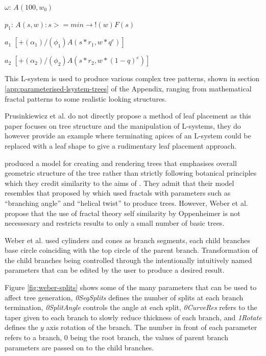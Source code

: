 \documentclass[final]{cmpreport}
\begin{document}
$\omega$: $A(100, w_0)$ 

\indent $p_1$: $A(s, w) : s >= min \rightarrow !(w)F(s)$

\indent $a_1$ $[+(\alpha_1)/(\phi_1)A(s * r_1, w * q ^ e)]$

\indent $a_2$ $[+(\alpha_2)/(\phi_2)A(s * r_2, w * (1 - q) ^ e)]$

This L-system is used to produce various complex tree patterns, shown in section 
\ref{app:parameterised-lsystem-trees} of the Appendix, ranging from mathematical fractal 
patterns to some realistic looking structures.

Prusinkiewicz et al. do not directly propose a method of leaf placement as this 
paper focuses on tree structure and the manipulation of L-systems, they do however provide 
an example where terminating apices of an L-system could be replaced with a leaf shape to 
give a rudimentary leaf placement approach.

\cite{weber1995rendering} produced a model for creating and rendering trees that emphasises 
overall geometric structure of the tree rather than strictly following botanical principles 
which they credit similarity to the aims of \cite{reeves1985approximate}. 
They admit that their model resembles that proposed by \cite{oppenheimer1986real} which used 
fractals with parameters such as ``branching angle'' and ``helical twist'' to produce trees. 
However, Weber et al. propose that the use of fractal theory self similarity by Oppenheimer 
is not necessesary and restricts results to only a small number of basic trees.

Weber et al. used cylinders and cones as branch segments, 
each child branches base circle coinciding with the top circle of the parent branch. 
Transformation of the child branches being controlled through the intentionally intuitively named 
parameters that can be edited by the user to produce a desired result.

Figure \ref{fig:weber-splits} shows some of the many parameters that can be used to affect 
tree generation, \emph{0SegSplits} defines the number of splits at each branch termination, 
\emph{0SplitAngle} controls the angle at each split, \emph{0CurveRes} refers to the taper 
given to each branch to slowly reduce thickness of each branch, and \emph{1Rotate} defines 
the $y$ axis rotation of the branch. The number in front of each parameter refers to a branch, 
0 being the root branch, the values of parent branch parameters are passed on to the child 
branches. 
\end{document}
